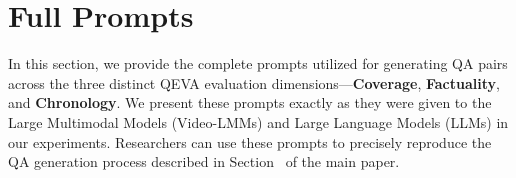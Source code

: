 \appendix

\section{Full Prompts}
\label{sec:full-prompts}
In this section, we provide the complete prompts utilized for generating QA pairs across the three distinct QEVA evaluation dimensions—\textbf{Coverage}, \textbf{Factuality}, and \textbf{Chronology}. We present these prompts exactly as they were given to the Large Multimodal Models (Video-LMMs) and Large Language Models (LLMs) in our experiments. Researchers can use these prompts to precisely reproduce the QA generation process described in Section~\label{section:3.2} of the main paper.




